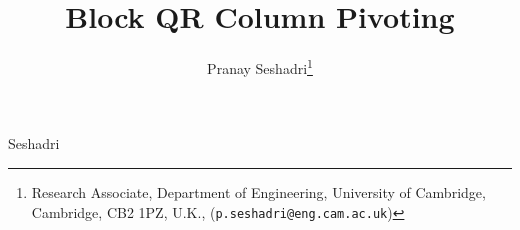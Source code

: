\title{Block QR Column Pivoting}

\author{Pranay Seshadri\thanks{Research Associate, Department of Engineering, University of Cambridge, Cambridge, CB2 1PZ, U.K., (\texttt{p.seshadri@eng.cam.ac.uk})}   }

{Seshadri}
